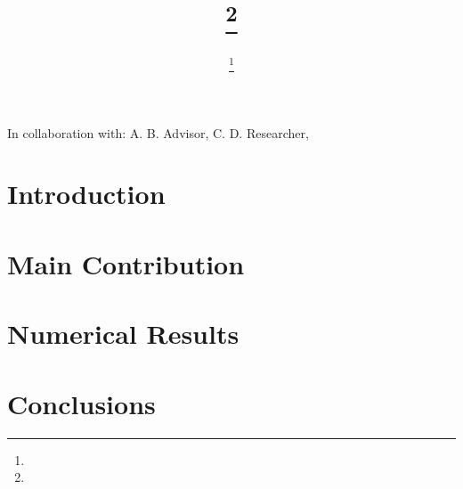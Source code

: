 \documentclass[review]{siamart251216}
\author{\TheName\thanks{\TheAddress}}
\title{{\TheTitle}\thanks{\TheFunding}}
\newcommand{\TheCollaborators}{%
  A. B. Advisor,
  C. D. Researcher,
}
\begin{document}
\maketitle

\begin{center}
In collaboration with:
  {\TheCollaborators}
\end{center}
\vspace{1cm}

\begin{abstract}
  \lipsum[1]
\end{abstract}

\begin{keywords}
\end{keywords}


\section{Introduction}\label{sec:intro}

\section{Main Contribution}\label{sec:main}

\section{Numerical Results}\label{sec:num}

\section{Conclusions}\label{sec:conc}



\end{document}
